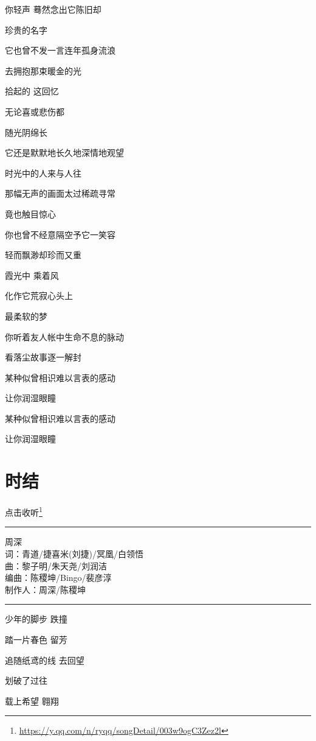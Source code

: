 \documentclass[]{ctexbook}
\renewcommand{\href}[2]{#2\footnote{\url{#1}}}
\begin{document}
你轻声 蓦然念出它陈旧却

珍贵的名字

它也曾不发一言连年孤身流浪

去拥抱那束暖金的光

拾起的 这回忆

无论喜或悲伤都

随光阴绵长

它还是默默地长久地深情地观望

时光中的人来与人往

那幅无声的画面太过稀疏寻常

竟也触目惊心

你也曾不经意隔空予它一笑容

轻而飘渺却珍而又重

霞光中 乘着风

化作它荒寂心头上

最柔软的梦

你听着友人帐中生命不息的脉动

看落尘故事逐一解封

某种似曾相识难以言表的感动

让你润湿眼瞳

某种似曾相识难以言表的感动

让你润湿眼瞳

\section*{时结}\label{shijie}


\href{https://y.qq.com/n/ryqq/songDetail/003w9ogC3Zez2l}{点击收听}

\begin{center}\rule{0.5\linewidth}{0.5pt}\end{center}

周深\\
词：青道/捷喜米(刘捷)/冥凰/白领悟\\
曲：黎子明/朱天尧/刘润洁\\
编曲：陈稷坤/Bingo/裴彦淳\\
制作人：周深/陈稷坤

\begin{center}\rule{0.5\linewidth}{0.5pt}\end{center}

少年的脚步 跌撞

踏一片春色 留芳

追随纸鸢的线 去回望

划破了过往

载上希望 翱翔
\end{document}
